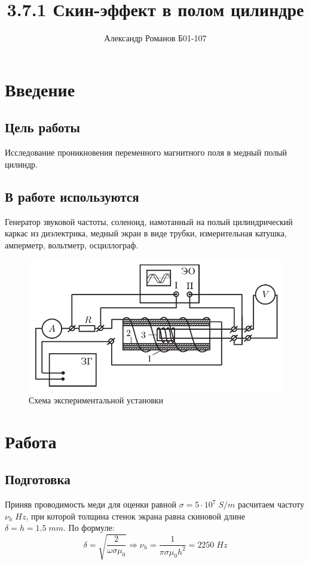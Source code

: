 \documentclass{article}
\author{Александр Романов Б01-107}
\date{}
\title{3.7.1 Скин-эффект в полом цилиндре}
\begin{document}
\maketitle
\section{Введение}
\subsection{Цель работы}
Исследование проникновения переменного магнитного поля в медный полый цилиндр.
\subsection{В работе используются}
Генератор звуковой частоты, соленоид, намотанный на полый цилиндрический каркас из диэлектрика,
медный экран в виде трубки, измерительная катушка, амперметр, вольтметр, осциллограф. 
\begin{figure}[H]
    \includegraphics[width=\textwidth]{scheme.png}
    \caption{Схема экспериментальной установки}
\end{figure}

\section{Работа}

\subsection{Подготовка}
Приняв проводимость меди для оценки равной \( \sigma = 5\cdot 10^{7}\; S/m \) расчитаем частоту \( \nu_h\; Hz \),
при которой толщина стенок экрана равна скиновой длине \( \delta = h = 1.5\; mm \). По формуле:
\[ \delta = \sqrt{\frac{2}{\omega \sigma \mu_0}} \Rightarrow \nu_h = \frac{1}{\pi\sigma\mu_0 h^2} = 2250\; Hz \]
\end{document}
